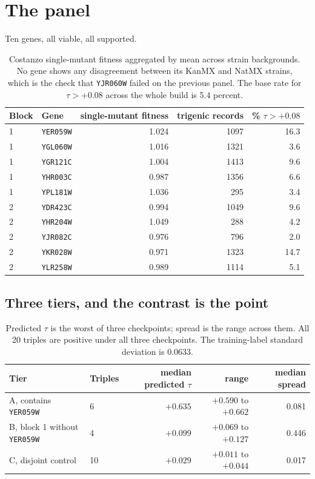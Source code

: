 \section{The panel}\label{sec:panel10}

Ten genes, all viable, all supported.

\begin{table}[H]
\centering
\begin{tabular}{llrrr}
\toprule
Block & Gene & single-mutant fitness & trigenic records & \% $\tau > +0.08$ \\
\midrule
1 & \texttt{YER059W} & 1.024 & 1097 & 16.3 \\
1 & \texttt{YGL060W} & 1.016 & 1321 & 3.6 \\
1 & \texttt{YGR121C} & 1.004 & 1413 & 9.6 \\
1 & \texttt{YHR003C} & 0.987 & 1356 & 6.6 \\
1 & \texttt{YPL181W} & 1.036 & 295  & 3.4 \\
\midrule
2 & \texttt{YDR423C} & 0.994 & 1049 & 9.6 \\
2 & \texttt{YHR204W} & 1.049 & 288  & 4.2 \\
2 & \texttt{YJR082C} & 0.976 & 796  & 2.0 \\
2 & \texttt{YKR028W} & 0.971 & 1323 & 14.7 \\
2 & \texttt{YLR258W} & 0.989 & 1114 & 5.1 \\
\bottomrule
\end{tabular}
\caption{Costanzo single-mutant fitness aggregated by mean across strain
backgrounds. No gene shows any disagreement between its KanMX and NatMX strains,
which is the check that \texttt{YJR060W} failed on the previous panel. The base
rate for $\tau > +0.08$ across the whole build is 5.4 percent.}
\end{table}

\subsection{Three tiers, and the contrast is the point}

\begin{table}[H]
\centering
\begin{tabular}{llrrr}
\toprule
Tier & Triples & median predicted $\tau$ & range & median spread \\
\midrule
A, contains \texttt{YER059W}      & 6  & $+0.635$ & $+0.590$ to $+0.662$ & 0.081 \\
B, block 1 without \texttt{YER059W} & 4  & $+0.099$ & $+0.069$ to $+0.127$ & 0.446 \\
C, disjoint control               & 10 & $+0.029$ & $+0.011$ to $+0.044$ & 0.017 \\
\bottomrule
\end{tabular}
\caption{Predicted $\tau$ is the worst of three checkpoints; spread is the range
across them. All 20 triples are positive under all three checkpoints. The
training-label standard deviation is $0.0633$.}
\end{table}


